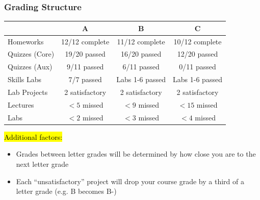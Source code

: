 \documentclass[slidestop,compress,mathserif]{beamer}
\begin{document}
\begin{frame}
	\frametitle{Grading Structure}
	\begin{table}[ht]
	\centering
	\small
	\begin{tabular}{|l|c|c|c|}
	\hline
	 & \textbf{A} & \textbf{B} & \textbf{C} \\
	\hline
	Homeworks & 12/12 complete & 11/12 complete & 10/12 complete \\
	\hline
	Quizzes (Core) & 19/20 passed & 16/20 passed & 12/20 passed \\
	\hline
	Quizzes (Aux) & 9/11 passed & 6/11 passed & 0/11 passed \\
	\hline
	Skills Labs & 7/7 passed & Labs 1-6 passed & Labs 1-6 passed \\
	\hline
	Lab Projects & 2 satisfactory & 2 satisfactory & 2 satisfactory \\
	\hline
	Lectures & $<5$ missed & $<9$ missed & $<15$ missed \\
	\hline
	Labs & $<2$ missed & $<3$ missed & $<4$ missed \\
	\hline
	\end{tabular}
	\end{table}

	\hl{Additional factors:}
	\begin{itemize}
		\item Grades between letter grades will be determined by how close you are to the next letter grade
		\item Each ``unsatisfactory'' project will drop your course grade by a third of a letter grade (e.g. B becomes B-)
	\end{itemize}
\end{frame}

\end{document}
